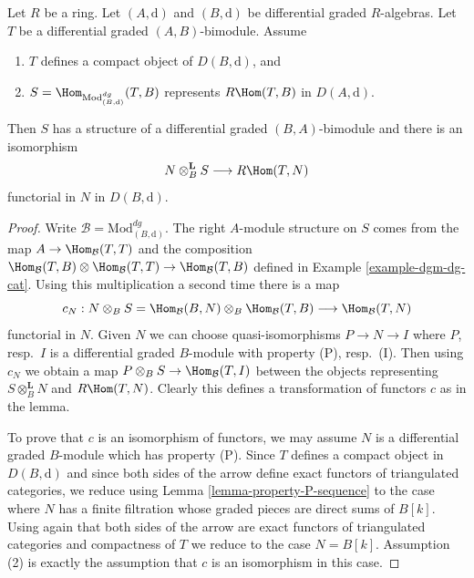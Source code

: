 \begin{lemma}
\label{lemma-RHom-is-tensor}
Let $R$ be a ring.
Let $(A, \text{d})$ and $(B, \text{d})$ be differential graded $R$-algebras.
Let $T$ be a differential graded $(A, B)$-bimodule.
Assume
\begin{enumerate}
\item $T$ defines a compact object of $D(B, \text{d})$, and
\item $S = \Hom_{\text{Mod}^{dg}_{(B, \text{d})}}(T, B)$
represents $R\Hom(T, B)$ in $D(A, \text{d})$.
\end{enumerate}
Then $S$ has a structure of a differential graded $(B, A)$-bimodule
and there is an isomorphism
$$
N \otimes_B^\mathbf{L} S \longrightarrow R\Hom(T, N)
$$
functorial in $N$ in $D(B, \text{d})$.
\end{lemma}

\begin{proof}
Write $\mathcal{B} = \text{Mod}^{dg}_{(B, \text{d})}$.
The right $A$-module structure on $S$ comes from the map
$A \to \Hom_\mathcal{B}(T, T)$ and the composition
$\Hom_\mathcal{B}(T, B) \otimes \Hom_\mathcal{B}(T, T)
\to \Hom_\mathcal{B}(T, B)$ defined in Example \ref{example-dgm-dg-cat}.
Using this multiplication a second time there is a map
$$
c_N :
N \otimes_B S = \Hom_\mathcal{B}(B, N) \otimes_B \Hom_\mathcal{B}(T, B)
\longrightarrow
\Hom_\mathcal{B}(T, N)
$$
functorial in $N$. Given $N$ we can choose quasi-isomorphisms
$P \to N \to I$ where $P$, resp.\ $I$ is a differential graded $B$-module
with property (P), resp.\ (I). Then using $c_N$ we obtain a map
$P \otimes_B S \to \Hom_\mathcal{B}(T, I)$ between the objects
representing $S \otimes_B^\mathbf{L} N$ and $R\Hom(T, N)$.
Clearly this defines a transformation of functors $c$ as in the lemma.

\medskip\noindent
To prove that $c$ is an isomorphism of functors, we may
assume $N$ is a differential graded $B$-module which
has property (P). Since $T$ defines a compact object in
$D(B, \text{d})$ and since both sides of the arrow define
exact functors of triangulated categories, we reduce using
Lemma \ref{lemma-property-P-sequence}
to the case where $N$ has a finite filtration whose
graded pieces are direct sums of $B[k]$. Using again that
both sides of the arrow are exact functors of triangulated
categories and compactness of $T$ we reduce to
the case $N = B[k]$. Assumption (2) is exactly the
assumption that $c$ is an isomorphism in this case.
\end{proof}






